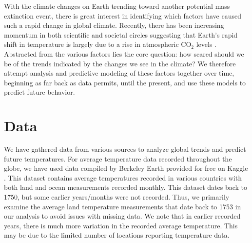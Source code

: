 \documentclass[11pt]{amsart}
\begin{document}
With the climate changes on Earth trending toward another potential mass extinction event, there is great interest in identifying which factors have caused such a rapid change in global climate.
Recently, there has been increasing momentum in both scientific and societal circles suggesting that Earth's rapid shift in temperature is largely due to a rise in atmospheric CO$_2$ levels \cite{foote1856art, arrhenius1896xxxi, callendar1938artificial, keeling1960concentration, manabe1967thermal, charney1979carbon, santer1996search}.
Abstracted from the various factors lies the core question: how scared should we be of the trends indicated by the changes we see in the climate?
We therefore attempt analysis and predictive modeling of these factors together over time, beginning as far back as data permits, until the present, and use these models to predict future behavior.



\section{Data} 

We have gathered data from various sources to analyze global trends and predict future temperatures. For average temperature data recorded throughout the globe, we have used data compiled by Berkeley Earth provided for free on Kaggle \cite{berkeleyearth_temperature}. This dataset contains average temperatures recorded in various countries with both land and ocean measurements recorded monthly. This dataset dates back to 1750, but some earlier years/months were not recorded. Thus, we primarily examine the average land temperature measurements that date back to 1753 in our analysis to avoid issues with missing data. We note that in earlier recorded years, there is much more variation in the recorded average temperature. This may be due to the limited number of locations reporting temperature data.
\end{document}
